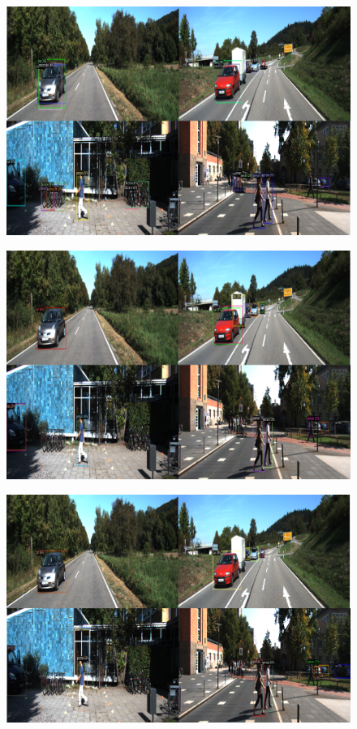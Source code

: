 \documentclass{article}
\begin{document}
\begin{figure}[h!]
  \begin{minipage}{0.47\textwidth}
  \includegraphics[width=\textwidth, height=0.17\textheight]{./../../figures/1shot kitti.png}
  \label{1 Shot}
  \end{minipage}
  \begin{minipage}{0.47\textwidth}
  \includegraphics[width=\textwidth, height=0.17\textheight]{./../../figures/5shot kitti.png}
  \label{5 Shot}
  \end{minipage}
  \begin{minipage}{0.47\textwidth}
  \includegraphics[width=\textwidth, height=0.17\textheight]{./../../figures/10shot kitti.png}

\end{minipage}
\end{figure}
\end{document}
